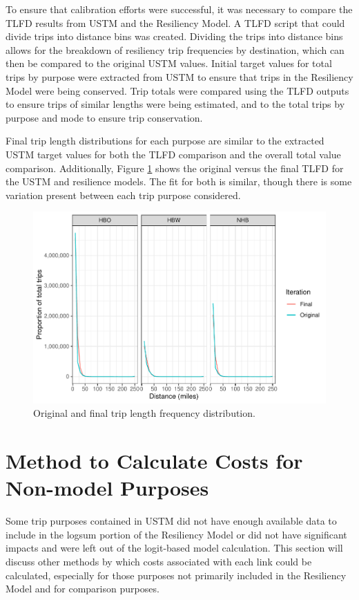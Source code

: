 To ensure that calibration efforts were successful, it was necessary to
compare the TLFD results from USTM and the Resiliency Model. A
TLFD script that could divide trips
into distance bins was created. Dividing the trips into distance bins allows for the
breakdown of resiliency trip frequencies by destination, which can then be
compared to the original USTM values. Initial target values for total
trips by purpose were extracted from USTM to ensure that trips in
the Resiliency Model were being conserved. Trip totals were compared using
the TLFD outputs to ensure trips of similar lengths were being estimated,
and to the total trips by purpose and mode to ensure trip conservation.

Final trip length distributions for each purpose are similar to the
extracted USTM target values for both the TLFD comparison and the overall
total value comparison. Additionally, Figure \ref{fig:ustm_tlfd} shows the original versus the final
TLFD for the USTM and resilience models. The fit for both is similar, though
there is some variation present between each trip purpose considered.

\begin{figure}

{\centering \includegraphics[width=0.75\linewidth]{figures/chapter3/TLFD.pdf}

}

\caption{Original and final trip length frequency distribution.}\label{fig:ustm_tlfd}
\end{figure}


\section{Method to Calculate Costs for Non-model Purposes}

Some trip purposes contained in USTM did not have enough available data to
include in the logsum portion of the Resiliency Model or did not have
significant impacts and were left out of the logit-based model
calculation. This section will discuss other methods by which costs
associated with each link could be calculated, especially for those
purposes not primarily included in the Resiliency Model and for comparison purposes.


